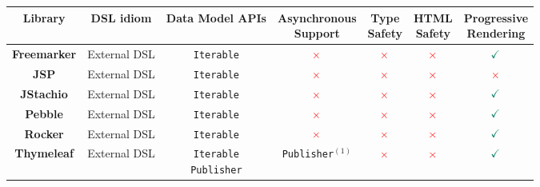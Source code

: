 \begin{table}[h]
  \small
  \tabcolsep=0.1cm
  \def\arraystretch{1.2}
  \begin{tabular}{|c|c|c|c|c|c|c|}
    \hline
    \textbf{Library}
     & \textbf{DSL idiom}
     & \textbf{Data Model APIs}
     & \shortstack{\textbf{Asynchronous}           \\\textbf{Support}}
     & \shortstack{\textbf{Type}                   \\\textbf{Safety}}
     & \shortstack{\textbf{HTML}                   \\\textbf{Safety}}
     & \shortstack{\textbf{Progressive}            \\\textbf{Rendering}}
    \\
    \hline
    \textbf{Freemarker}
     & External DSL
     & \texttt{Iterable}
     & \large{$\textcolor{red}{\times}$}
     & \large{$\textcolor{red}{\times}$}
     & \large{$\textcolor{red}{\times}$}
     & \large{$\textcolor{PineGreen}{\checkmark}$}
    \\
    \hline
    \textbf{JSP}
     & External DSL
     & \texttt{Iterable}
     & \large{$\textcolor{red}{\times}$}
     & \large{$\textcolor{red}{\times}$}
     & \large{$\textcolor{red}{\times}$}
     & \large{$\textcolor{red}{\times}$}
    \\
    \hline
    \textbf{JStachio}
     & External DSL
     & \texttt{Iterable}
     & \large{$\textcolor{red}{\times}$}
     & \large{$\textcolor{red}{\times}$}
     & \large{$\textcolor{red}{\times}$}
     & \large{$\textcolor{PineGreen}{\checkmark}$}
    \\\hline
    \textbf{Pebble}
     & External DSL
     & \texttt{Iterable}
     & \large{$\textcolor{red}{\times}$}
     & \large{$\textcolor{red}{\times}$}
     & \large{$\textcolor{red}{\times}$}
     & \large{$\textcolor{PineGreen}{\checkmark}$}
    \\
    \hline
    \textbf{Rocker}
     & External DSL
     & \texttt{Iterable}
     & \large{$\textcolor{red}{\times}$}
     & \large{$\textcolor{red}{\times}$}
     & \large{$\textcolor{red}{\times}$}
     & \large{$\textcolor{PineGreen}{\checkmark}$}
    \\
    \hline
    \textbf{Thymeleaf}
     & External DSL
     & \shortstack{\texttt{Iterable}               \\\texttt{Publisher}}
     & \texttt{Publisher}$^{(1)}$
     & \large{$\textcolor{red}{\times}$}
     & \large{$\textcolor{red}{\times}$}
     & \large{$\textcolor{PineGreen}{\checkmark}$}
    \\

\end{tabular}
\end{table}
